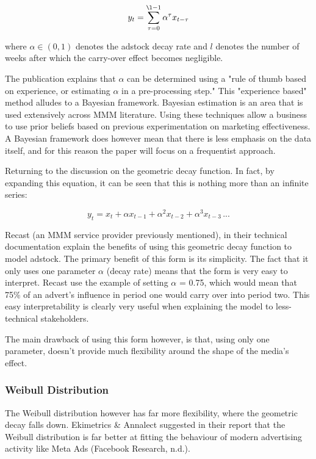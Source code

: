 \documentclass[11pt, a4paper]{article}
\begin{document}
\begin{equation}y_{t}=\sum_{\tau=0}^{\l-1}\alpha^{\tau}x_{t-\tau}\end{equation}

where $\alpha\in (0,1)$ denotes the adstock decay rate and $l$ denotes the number of weeks after which the carry-over effect becomes negligible.


The publication explains that $\alpha$ can be determined using a "rule of thumb based on experience, or estimating $\alpha$ in a pre-processing step." This "experience based" method alludes to a Bayesian framework. Bayesian estimation is an area that is used extensively across MMM literature. Using these techniques allow a business to use prior beliefs based on previous experimentation on marketing effectiveness. A Bayesian framework does however mean that there is less emphasis on the data itself, and for this reason the paper will focus on a frequentist approach. 

Returning to the discussion on the geometric decay function. In fact, by expanding this equation, it can be seen that this is nothing more than an infinite series: 

\begin{equation}
y_{t}=x_{t} + \alpha x_{t-1} + \alpha^{2}x_{t-2} + \alpha^{3}x_{t-3}\,...
\end{equation}

Recast (an MMM service provider previously mentioned), in their technical documentation  explain the benefits of using this geometric decay function to model adstock. The primary benefit of this form is its simplicity. The fact that it only uses one parameter $\alpha$ (decay rate) means that the form is very easy to interpret. Recast use the example of setting $\alpha$ = 0.75, which would mean that 75\% of an advert’s influence in period one would carry over into period two. This easy interpretability is clearly very useful when explaining the model to less-technical stakeholders.

The main drawback of using this form however, is that, using only one parameter, doesn’t provide much flexibility around the shape of the media’s effect. 

\subsubsection{Weibull Distribution}

The Weibull distribution however has far more flexibility, where the geometric decay falls down. Ekimetrics \& Annalect suggested in their report that the Weibull distribution is far better at fitting the behaviour of modern advertising activity like Meta Ads (Facebook Research, n.d.).
\end{document}
